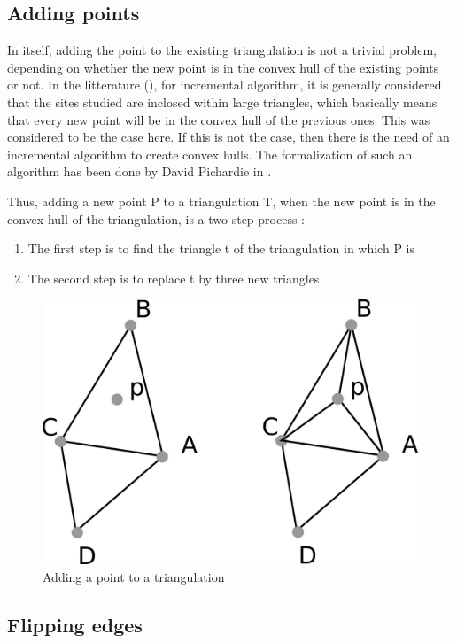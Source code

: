 \documentclass[a4paper,10pt]{article}
\begin{document}
\subsection{Adding points}

In itself, adding the point to the existing triangulation is not a trivial problem, depending on whether the new point is in the convex hull of the existing points or not. In the litterature (\cite{Del}), for incremental algorithm, it is generally considered that the sites studied are inclosed within large triangles, which basically means that every new point will be in the convex hull of the previous ones. This was considered to be the case here. If this is not the case, then there is the need of an incremental algorithm to create convex hulls. The formalization of such an algorithm has been done by David Pichardie in \cite{Hull}.

Thus, adding a new point P to a triangulation T, when the new point is in the convex hull of the triangulation, is a two step process :
\begin{enumerate}
\item The first step is to find the triangle t of the triangulation in which P is 
\item The second step is to replace t by three new triangles.
\end{enumerate}
\begin{figure}[h]
\centering
\caption{Adding a point to a triangulation}
\includegraphics[scale=1]{adding} 
\end{figure}
\subsection{Flipping edges}
\end{document}
